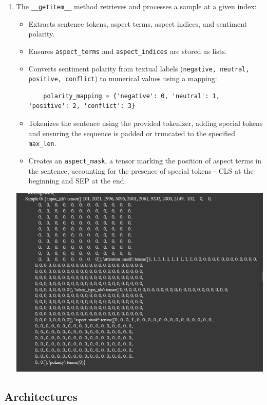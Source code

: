 \documentclass{article}
\begin{document}
\begin{enumerate}
\item The \texttt{\_\_getitem\_\_} method retrieves and processes a sample at a given index:
\begin{itemize}
    \item Extracts sentence tokens, aspect terms, aspect indices, and sentiment polarity.
    \item Ensures \texttt{aspect\_terms} and \texttt{aspect\_indices} are stored as lists.
    \item Converts sentiment polarity from textual labels (\texttt{negative, neutral, positive, conflict}) to numerical values using a mapping:
    \begin{verbatim}
    polarity_mapping = {'negative': 0, 'neutral': 1, 'positive': 2, 'conflict': 3}
    \end{verbatim}
    \item Tokenizes the sentence using the provided tokenizer, adding special tokens and ensuring the sequence is padded or truncated to the specified \texttt{max\_len}.
    \item Creates an \texttt{aspect\_mask}, a tensor marking the position of aspect terms in the sentence, accounting for the presence of special tokens - CLS at the beginning and SEP at the end.
\end{itemize}
\begin{center}
\includegraphics[width=1\textwidth]{ABSA Dataset.png}
\end{center}
\end{enumerate}

\subsection{Architectures}
\end{document}
